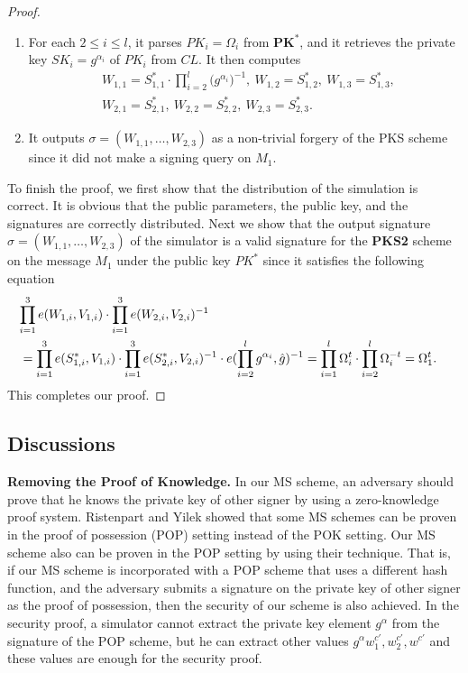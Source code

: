 \documentclass[11pt,letterpaper]{article}
\newcommand{\vect}[1]{\mathbf{#1}}
\newcommand{\tb}[1]{\textbf{#1}}
\begin{document}
\begin{proof}
\begin{enumerate}
\item For each $2\leq i\leq l$, it parses $PK_i = \Omega_i$ from
    $\vect{PK}^*$, and it retrieves the private key $SK_i = g^{\alpha_i}$
    of $PK_i$ from $CL$. It then computes
    \begin{align*}
    &   W_{1,1} = S_{1,1}^* \cdot \prod_{i=2}^l \big( g^{\alpha_i} \big)^{-1},~
        W_{1,2} = S_{1,2}^*,~
        W_{1,3} = S_{1,3}^*,~ \\
    &   W_{2,1} = S_{2,1}^*,~
        W_{2,2} = S_{2,2}^*,~
        W_{2,3} = S_{2,3}^*.
    \end{align*}

\item It outputs $\sigma = (W_{1,1}, \ldots, W_{2,3})$ as a non-trivial
    forgery of the PKS scheme since it did not make a signing query on
    $M_1$.
\end{enumerate}

To finish the proof, we first show that the distribution of the simulation is
correct. It is obvious that the public parameters, the public key, and the
signatures are correctly distributed. Next we show that the output signature
$\sigma = (W_{1,1}, \ldots, W_{2,3})$ of the simulator is a valid signature
for the \tb{PKS2} scheme on the message $M_1$ under the public key $PK^*$
since it satisfies the following equation
    \begin{align*}
    \lefteqn{
        \prod_{i=1}^3 e(W_{1,i}, V_{1,i}) \cdot
        \prod_{i=1}^3 e(W_{2,i}, V_{2,i})^{-1} } \\
    &=  \prod_{i=1}^3 e(S_{1,i}^*, V_{1,i}) \cdot
        \prod_{i=1}^3 e(S_{2,i}^*, V_{2,i})^{-1} \cdot
        e(\prod_{i=2}^l g^{\alpha_i}, \hat{g})^{-1}
     =  \prod_{i=1}^l \Omega_i^t \cdot
        \prod_{i=2}^l \Omega_i^{-t}
     =  \Omega_1^t.
    \end{align*}
This completes our proof.
\end{proof}

\subsection{Discussions}

\tb{Removing the Proof of Knowledge.} In our MS scheme, an adversary should
prove that he knows the private key of other signer by using a zero-knowledge
proof system. Ristenpart and Yilek \cite{RistenpartY07} showed that some MS
schemes can be proven in the proof of possession (POP) setting instead of the
POK setting. Our MS scheme also can be proven in the POP setting by using
their technique. That is, if our MS scheme is incorporated with a POP scheme
that uses a different hash function, and the adversary submits a signature on
the private key of other signer as the proof of possession, then the security
of our scheme is also achieved. In the security proof, a simulator cannot
extract the private key element $g^{\alpha}$ from the signature of the POP
scheme, but he can extract other values $g^{\alpha} w_1^{c'}, w_2^{c'},
w^{c'}$ and these values are enough for the security proof.
\end{document}
